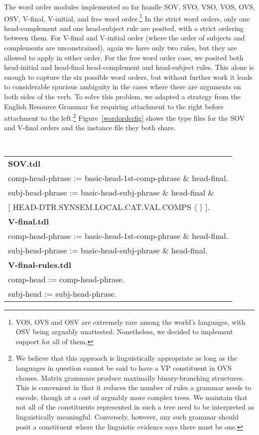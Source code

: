 \documentclass[11pt]{article}
\begin{document}
The word order modules implemented so far handle 
SOV, SVO, VSO, VOS, OVS, OSV, V-final, V-initial, and
free word order.\footnote{VOS, OVS and OSV are extremely rare among
the world's languages, with OSV being arguably unattested.
Nonetheless, we decided to implement support for all of them.}  In the
strict word orders, only one head-complement and one head-subject rule
are posited, with a strict ordering between them.  For V-final and
V-initial order (where the order of subjects and complements are
unconstrained), again we have only two rules, but they are allowed to
apply in either order.  For the free word order case, we posited both
head-initial and head-final head-complement and head-subject rules.
This alone is enough to capture the six possible word orders, but
without further work it leads to considerable spurious ambiguity in
the cases where there are arguments on both sides of the verb.  To
solve this problem, we adapted a strategy from the English Resource
Grammar for requiring attachment to the right before attachment to the
left.\footnote{We believe that this approach is linguistically
appropriate as long as the languages in question cannot be said to
have a VP constituent in OVS clauses.  Matrix grammars produce
maximally binary-branching structures.  This is convenient in that it
reduces the number of rules a grammar needs to encode, though at a
cost of arguably more complex trees.  We maintain that not all of the
constituents represented in such a tree need to be interpreted as
linguistically meaningful.  Conversely, however, any such grammar
should posit a constituent where the linguistic evidence says there
must be one.}
Figure~\ref{wordorderfig} shows the type files for the SOV and
V-final orders and the instance file they both share.

\begin{figure*}[ht]
\begin{center}
{\tt\small
\begin{tabular}{l}
\hline
{\bf SOV.tdl}\\
comp-head-phrase := basic-head-1st-comp-phrase \& head-final.\\
subj-head-phrase := basic-head-subj-phrase \& head-final \&\\
   \phantom{foo}[ HEAD-DTR.SYNSEM.LOCAL.CAT.VAL.COMPS $\langle$ $\rangle$ ].\\
{\bf V-final.tdl}\\
comp-head-phrase := basic-head-1st-comp-phrase \& head-final.\\
subj-head-phrase := basic-head-subj-phrase \& head-final.\\
{\bf V-final-rules.tdl}\\
comp-head := comp-head-phrase.\\
subj-head := subj-head-phrase.\\
\hline
\end{tabular}
}
\end{center}
\caption{SOV and V-final basic word order modules}
\label{wordorderfig}
\end{figure*}
\end{document}

